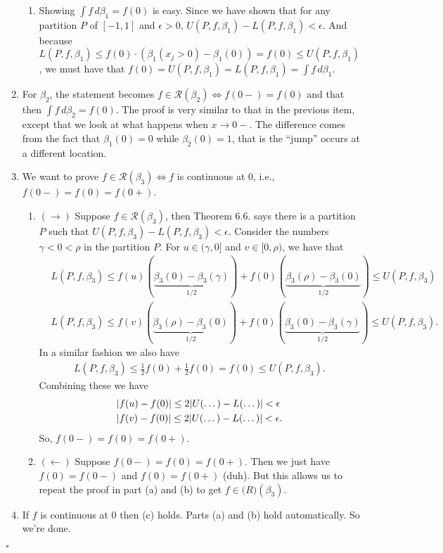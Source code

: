 \documentclass[11pt]{article}
\begin{document}
\begin{enumerate}
\begin{enumerate}
		\item Showing $\int f\,d\beta_1 = f(0)$ is easy. Since we have shown that for any partition $P$  of $[-1,1]$ and $\epsilon > 0$,  $U(P,f,\beta_1) - L(P,f,\beta_1) < \epsilon $. And because $L(P,f,\beta_1) \leq f(0)\cdot (\beta_1(x_j > 0) - \beta_1(0)) =f(0) \leq U(P,f,\beta_1)$, we must have that $f(0) = U(P,f,\beta_1) = L(P,f,\beta_1) = \int f\,d\beta_1$. 
	\end{enumerate}


	\item For $\beta_2$, the statement becomes $f \in \mathscr{R}(\beta_2) \iff f(0-) = f(0)$ and that then $\int f\,d\beta_2 = f(0)$. The proof is very similar to that in the previous item, except that we look at what happens when $x\to 0-$. The difference comes from the fact that $\beta_1(0) =0$ while $\beta_2(0) = 1$, that is the ``jump'' occurs at a different location. 
	
	
	\item We want to prove $f\in \mathscr{R}(\beta_3) \iff f$ is continuous at $0$, i.e., $f(0-) = f(0) = f(0+)$.  
	\begin{enumerate}
		\item $(\to)$ Suppose $f\in \mathscr{R}(\beta_3)$, then Theorem 6.6. says there is a partition $P$ such that $U(P,f,\beta_3) - L(P,f,\beta_3) < \epsilon$. Consider the numbers $\gamma < 0 < \rho$ in the partition $P$. For $u \in (\gamma, 0]$ and $v \in [0 ,\rho)$, we have that 
		\begin{align*}
		&L(P,f,\beta_3) \leq f(u)(\underbrace{\beta_3(0) - \beta_3(\gamma)}_{1/2}) + f(0)(\underbrace{\beta_3(\rho) - \beta_3(0)}_{1/2}) \leq U(P,f,\beta_3)\\
		&L(P,f,\beta_3) \leq f(v)(\underbrace{\beta_3(\rho) - \beta_3(0)}_{1/2}) + f(0)(\underbrace{\beta_3(0) - \beta_3(\gamma)}_{1/2}) \leq U(P,f,\beta_3).
		\end{align*} 
		In a similar fashion we also have 
		\begin{align*}
		L(P,f,\beta_3) \leq \frac{1}{2}f(0) + \frac{1}{2}f(0) = f(0) \leq U(P,f,\beta_3).
		\end{align*}
		Combining these we have
		\begin{align*}
		&\abs{f(u) - f(0)} \leq 2\abs{U(\dots) - L(\dots)} < \epsilon\\
		&\abs{f(v) - f(0)} \leq 2\abs{U(\dots) - L(\dots)} < \epsilon.
		\end{align*}
		So, $f(0-) = f(0) = f(0+)$. 
		
		\item $(\leftarrow)$ Suppose $f(0-) = f(0) = f(0+)$. Then we just have $f(0) = f(0-)$ and $f(0) = f(0+)$ (duh). But this allows us to repeat the proof in part (a) and (b) to get $f \in \mathscr(R)(\beta_3)$. 
		
	\end{enumerate}

	\item If $f$ is continuous at $0$ then (c) holds. Parts (a) and (b) hold automatically. So we're done. 
\end{enumerate}
\hfill $\square$\\
\end{document}
